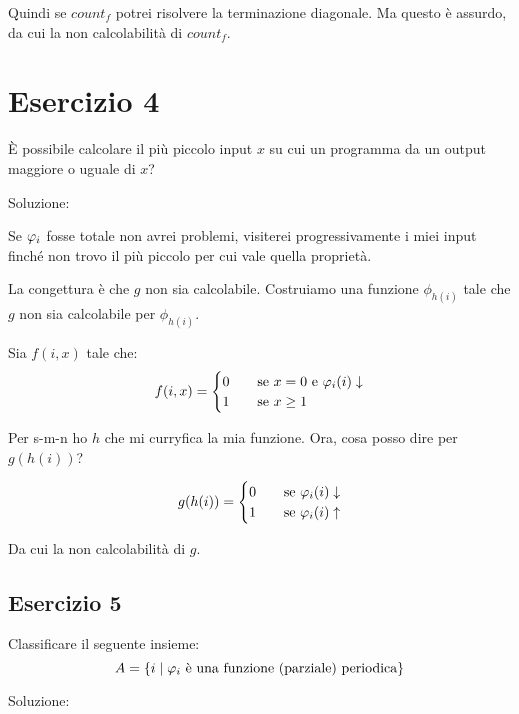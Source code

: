 Quindi se $\textit{count}_{f}$ potrei risolvere la terminazione diagonale. Ma questo è assurdo, da
cui la non calcolabilità di $\textit{count}_{f}$.

\section{Esercizio 4}

È possibile  calcolare  il  più  piccolo  input $x$ su cui un programma da un output maggiore o
uguale di $x$?

Soluzione:

Se $\varphi_{i}$ fosse totale non avrei problemi, visiterei progressivamente i miei input finché non trovo
il più piccolo per cui vale quella proprietà.

La congettura è che $g$ non sia calcolabile. Costruiamo una funzione $\phi_{h(i)}$ tale che $g$ non sia
calcolabile per $\phi_{h(i)}$.

Sia $f(i,x)$ tale che:
\begin{equation*}
    f(i,x) =
    \begin{cases}
        0 \quad &\text{se $x = 0$ e $\varphi_{i}(i) \downarrow$}\\
        1 \quad &\text{se $x \geq 1$}
    \end{cases}
\end{equation*}

Per s-m-n ho $h$ che mi curryfica la mia funzione. Ora, cosa posso dire per $g(h(i))$?

\begin{equation*}
    g(h(i)) =
    \begin{cases}
        0 \quad &\text{se $\varphi_{i}(i) \downarrow$}\\
        1 \quad &\text{se $\varphi_{i}(i) \uparrow$}\\
    \end{cases}
\end{equation*}

Da cui la non calcolabilità di $g$.

\subsection{Esercizio 5}

Classificare il seguente insieme:
\begin{equation*}
    A = \{i \mid \text{$\varphi_{i}$ è una funzione (parziale) periodica}\}
\end{equation*}

Soluzione:

